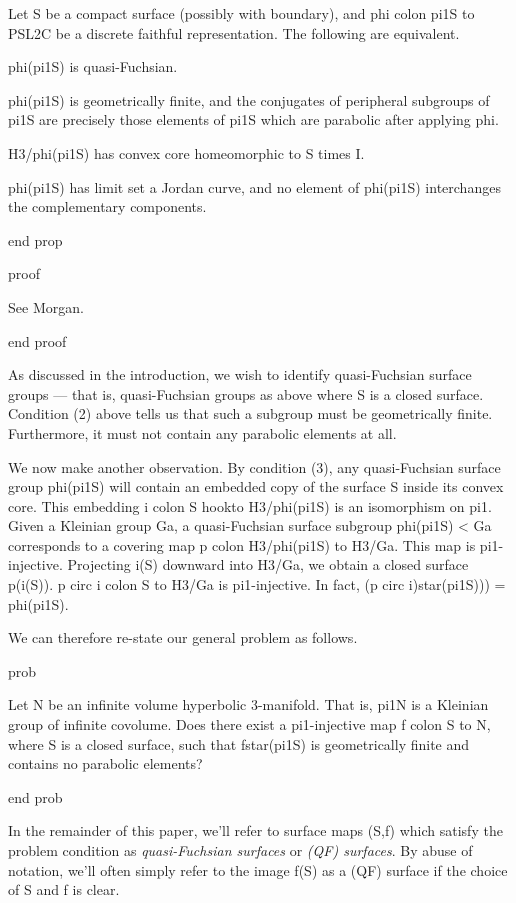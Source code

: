 Let S be a compact surface (possibly with boundary), and phi colon pi1S to
PSL2C be a discrete faithful representation. The following are equivalent.

phi(pi1S) is quasi-Fuchsian.

phi(pi1S) is geometrically finite, and the conjugates of peripheral subgroups
of pi1S are precisely those elements of pi1S which are parabolic after applying
phi.

H3/phi(pi1S) has convex core homeomorphic to S times I.

phi(pi1S) has limit set a Jordan curve, and no element of phi(pi1S)
interchanges the complementary components.

end prop

proof

See Morgan.%

end proof

As discussed in the introduction, we wish to identify quasi-Fuchsian surface
groups --- that is, quasi-Fuchsian groups as above where S is a closed surface.
Condition (2) above tells us that such a subgroup must be geometrically finite.
Furthermore, it must not contain any parabolic elements at all.

We now make another observation. By condition (3), any quasi-Fuchsian surface
group phi(pi1S) will contain an embedded copy of the surface S inside its
convex core.  This embedding i colon S hookto H3/phi(pi1S) is an isomorphism on
pi1.  Given a Kleinian group Ga, a quasi-Fuchsian surface subgroup phi(pi1S)
< Ga corresponds to a covering map p colon H3/phi(pi1S) to H3/Ga. This map is
pi1-injective.  Projecting i(S) downward into H3/Ga, we obtain a closed surface
p(i(S)). p circ i colon S to H3/Ga is pi1-injective. In fact, (p circ
i)star(pi1S))) = phi(pi1S).

We can therefore re-state our general problem as follows.

prob

Let N be an infinite volume hyperbolic 3-manifold. That is, pi1N is a Kleinian
group of infinite covolume. Does there exist a pi1-injective map f colon S to
N, where S is a closed surface, such that fstar(pi1S) is geometrically finite
and contains no parabolic elements?

end prob

In the remainder of this paper, we'll refer to surface maps (S,f) which satisfy
the problem condition as \emph{quasi-Fuchsian surfaces} or \emph{(QF)
surfaces}. By abuse of notation, we'll often simply refer to the image f(S) as
a (QF) surface if the choice of S and f is clear.

